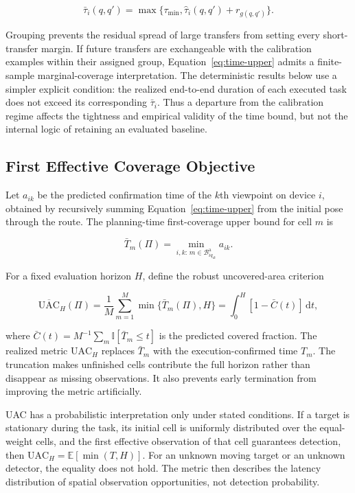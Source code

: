\begin{equation}\label{eq:time-upper}
\bar\tau_i(q,q')=\max\{\tau_{\min},\hat\tau_i(q,q')+r_{g(q,q')}\}.
\end{equation}

Grouping prevents the residual spread of large transfers from setting every short-transfer margin. If future transfers are exchangeable with the calibration examples within their assigned group, Equation~\eqref{eq:time-upper} admits a finite-sample marginal-coverage interpretation. The deterministic results below use a simpler explicit condition: the realized end-to-end duration of each executed task does not exceed its corresponding $\bar\tau_i$. Thus a departure from the calibration regime affects the tightness and empirical validity of the time bound, but not the internal logic of retaining an evaluated baseline.

\subsection{First Effective Coverage Objective}

Let $a_{ik}$ be the predicted confirmation time of the $k$th viewpoint on device $i$, obtained by recursively summing Equation~\eqref{eq:time-upper} from the initial pose through the route. The planning-time first-coverage upper bound for cell $m$ is

\begin{equation}\label{eq:first-time}
\bar T_m(\Pi)=
\min_{i,k:\,m\in\mathcal B^{\mathrm a}_{iq_{ik}}} a_{ik}.
\end{equation}

For a fixed evaluation horizon $H$, define the robust uncovered-area criterion

\begin{equation}\label{eq:uac}
\overline{\mathrm{UAC}}_H(\Pi)
=\frac{1}{M}\sum_{m=1}^{M}\min\{\bar T_m(\Pi),H\}
=\int_0^H[1-\bar C(t)]\,\mathrm dt,
\end{equation}

where $\bar C(t)=M^{-1}\sum_m\mathbb I[\bar T_m\leq t]$ is the predicted covered fraction. The realized metric $\mathrm{UAC}_H$ replaces $\bar T_m$ with the execution-confirmed time $T_m$. The truncation makes unfinished cells contribute the full horizon rather than disappear as missing observations. It also prevents early termination from improving the metric artificially.

UAC has a probabilistic interpretation only under stated conditions. If a target is stationary during the task, its initial cell is uniformly distributed over the equal-weight cells, and the first effective observation of that cell guarantees detection, then $\mathrm{UAC}_H=\mathbb E[\min(T,H)]$. For an unknown moving target or an unknown detector, the equality does not hold. The metric then describes the latency distribution of spatial observation opportunities, not detection probability.

